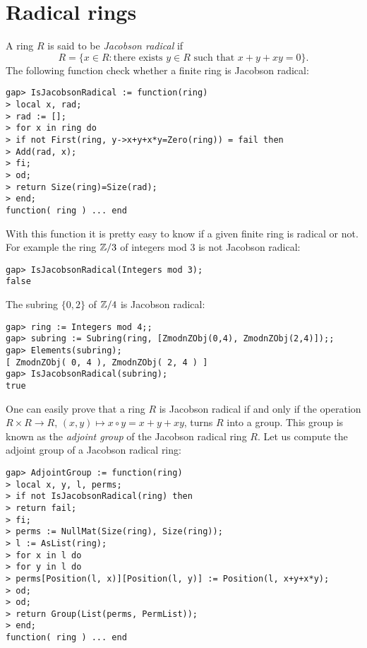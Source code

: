 \chapter{Radical rings}

A ring $R$ is said to be 
\emph{Jacobson radical} if 
\[
	R=\{x\in R:\text{there exists $y\in R$ such that $x+y+xy=0$}\}.
\]
The following function check whether a finite ring is Jacobson radical: 
\begin{lstlisting}
gap> IsJacobsonRadical := function(ring)
> local x, rad;
> rad := [];
> for x in ring do
> if not First(ring, y->x+y+x*y=Zero(ring)) = fail then
> Add(rad, x);
> fi;
> od;
> return Size(ring)=Size(rad);
> end;
function( ring ) ... end
\end{lstlisting}


With this function it is pretty easy to know if a given finite ring is radical
or not. For example the ring $\mathbb{Z}/3$ of integers mod 3 is not Jacobson radical:
\begin{lstlisting}
gap> IsJacobsonRadical(Integers mod 3);
false
\end{lstlisting}

\begin{example}
	The subring $\{0,2\}$ of $\mathbb{Z}/4$ is Jacobson radical:
\begin{lstlisting}
gap> ring := Integers mod 4;;
gap> subring := Subring(ring, [ZmodnZObj(0,4), ZmodnZObj(2,4)]);;
gap> Elements(subring);
[ ZmodnZObj( 0, 4 ), ZmodnZObj( 2, 4 ) ]
gap> IsJacobsonRadical(subring);
true
\end{lstlisting}
\end{example}

One can easily prove that a ring $R$ is Jacobson radical if and only if the
operation $R\times R\to R$, $(x,y)\mapsto x\circ y=x+y+xy$, turns $R$ into a
group. This group is known as the \emph{adjoint group} of the Jacobson radical
ring $R$. Let us compute the adjoint group of a Jacobson radical ring:

\begin{lstlisting}
gap> AdjointGroup := function(ring)
> local x, y, l, perms;
> if not IsJacobsonRadical(ring) then
> return fail;
> fi;
> perms := NullMat(Size(ring), Size(ring));
> l := AsList(ring);
> for x in l do
> for y in l do
> perms[Position(l, x)][Position(l, y)] := Position(l, x+y+x*y);
> od;
> od;
> return Group(List(perms, PermList));
> end;
function( ring ) ... end
\end{lstlisting}

